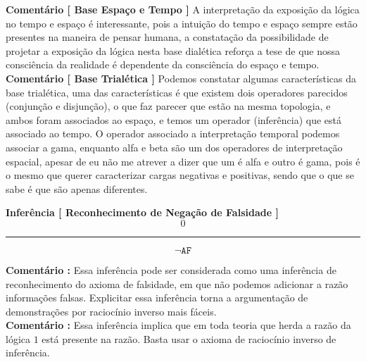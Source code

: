\documentclass[10pt,a4paper]{report}
\begin{document}
\textbf{Comentário [ Base Espaço e Tempo ]} A interpretação da exposição da lógica no tempo e espaço é interessante, pois a intuição do tempo e espaço sempre estão presentes na maneira de pensar humana, a constatação da possibilidade de projetar a exposição da lógica nesta base dialética reforça a tese de que nossa consciência da realidade é dependente da consciência do espaço e tempo.\\

\textbf{Comentário [ Base Trialética ]} Podemos constatar algumas características da base trialética, uma das características é que existem dois operadores parecidos (conjunção e disjunção), o que faz parecer que estão na mesma topologia, e ambos foram associados ao espaço, e temos um operador (inferência) que está associado ao tempo. O operador associado a interpretação temporal podemos associar a gama, enquanto alfa e beta são um dos operadores de interpretação espacial, apesar de eu não me atrever a dizer que um é alfa e outro é gama, pois é o mesmo que querer caracterizar cargas negativas e positivas, sendo que o que se sabe é que são apenas diferentes.


\hspace{\baselineskip}

\textbf{Inferência [ Reconhecimento de Negação de Falsidade ]}
$$ 0 $$
\hrule
$$ \neg \texttt{AF}$$

\textbf{Comentário :} Essa inferência pode ser considerada como uma inferência de reconhecimento do axioma de falsidade, em que não podemos adicionar a razão informações falsas. Explicitar essa inferência torna a argumentação de demonstrações por raciocínio inverso mais fáceis.\\

\textbf{Comentário :} Essa inferência implica que em toda teoria que herda a razão da lógica $1$ está presente na razão. Basta usar o axioma de raciocínio inverso de inferência.


\hspace{\baselineskip}
\end{document}
